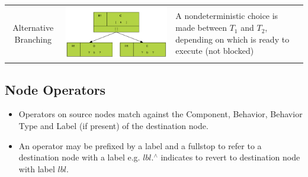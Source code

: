 \documentclass[]{article}
\begin{document}
\begin{tabularx}{\textwidth}{|c|c|X|}
Alternative Branching&\includegraphics{figs/AppendixB/Composition/Alternative}& 
A nondeterministic choice is made between $T_1$ and $T_2$, depending on which is ready to execute (not blocked)
\end{tabularx}


\subsection{Node Operators}
\begin{itemize}
\item Operators on source nodes match against the Component, Behavior, Behavior Type and Label (if present) of the destination node.
\item An operator may be prefixed by a label and a fullstop to refer to a destination node with a label e.g. $lbl.^{\wedge}$ indicates to revert to destination node with label $lbl$.
\end{itemize}
\end{document}
